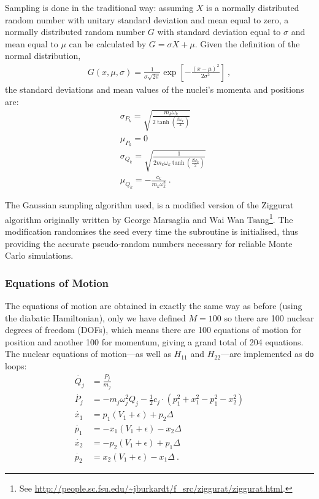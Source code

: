 Sampling is done in the traditional way: assuming $ X $ is a normally distributed random number with unitary standard deviation and mean equal to zero, a normally distributed random number $ G $ with standard deviation equal to $ \sigma $ and mean equal to $ \mu $ can be calculated by $ G = \sigma X + \mu $. Given the definition of the normal distribution,
\begin{align}
G(x, \mu, \sigma) = \frac{1}{\sigma \sqrt{2\pi}} \exp\left[- \frac{(x-\mu)^{2}}{2 \sigma^{2}}\right]~,
\end{align}
the standard deviations and mean values of the nuclei's momenta and positions are:
\begin{subequations}
\begin{align}
&\sigma_{P_{k}} = \sqrt{\frac{m_{k} \omega_{k}}{2 \tanh\left(\frac{\beta \omega_{k}}{2}\right)}}\\
&\mu_{P_{k}} = 0\\
&\sigma_{Q_{k}} = \sqrt{\frac{1}{2 m_{k} \omega_{k} \tanh\left(\frac{\beta \omega_{k}}{2}\right)}}\\
&\mu_{Q_{k}} = -\frac{c_{k}}{m_{k} \omega_{k}^{2}}~.
\end{align}
\end{subequations}

The Gaussian sampling algorithm used, is a modified version of the Ziggurat algorithm originally written by George Marsaglia and Wai Wan Tsang\footnote{See \url{http://people.sc.fsu.edu/~jburkardt/f\_src/ziggurat/ziggurat.html}.}. The modification randomises the seed every time the subroutine is initialised, thus providing the accurate pseudo-random numbers necessary for reliable Monte Carlo simulations.
%
\subsubsection{Equations of Motion}
%
The equations of motion are obtained in exactly the same way as before (using the diabatic Hamiltonian), only we have defined $ M = 100 $ so there are 100 nuclear degrees of freedom (DOFs), which means there are 100 equations of motion for position and another 100 for momentum, giving a grand total of 204 equations. The nuclear equations of motion---as well as $ H_{11} $ and $ H_{22} $---are implemented as {\color{DarkViolet}\texttt{do}} loops:
\begin{subequations}
\begin{align}
\dot{Q_{j}} &= \frac{P_{j}}{m_{j}}\\
\dot{P_{j}} &= -m_{j}\omega_{j}^{2}Q_{j} - \frac{1}{2}c_{j}\cdot(p_{1}^{2} + x_{1}^{2} - p_{1}^{2} - x_{2}^{2})\\
\dot{x_{1}} & = p_{1}(V_{1} + \epsilon) + p_{2}\Delta\\
\dot{p_{1}} & = -x_{1}(V_{1} + \epsilon) - x_{2}\Delta\\
\dot{x_{2}} & = -p_{2}(V_{1} + \epsilon) + p_{1}\Delta\\
\dot{p_{2}} & = x_{2}(V_{1} + \epsilon) - x_{1}\Delta~.
\end{align}
\end{subequations}
%
